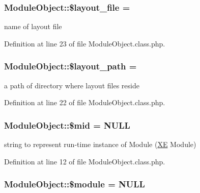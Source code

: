 \subsubsection[{\texorpdfstring{\$layout\+\_\+file}{$layout_file}}]{\setlength{\rightskip}{0pt plus 5cm}Module\+Object\+::\$layout\+\_\+file = \textquotesingle{}\textquotesingle{}}\hypertarget{classModuleObject_a2a1677b06eb7b3ff04ff19e960a64e08}{}\label{classModuleObject_a2a1677b06eb7b3ff04ff19e960a64e08}


name of layout file 



Definition at line 23 of file Module\+Object.\+class.\+php.

\subsubsection[{\texorpdfstring{\$layout\+\_\+path}{$layout_path}}]{\setlength{\rightskip}{0pt plus 5cm}Module\+Object\+::\$layout\+\_\+path = \textquotesingle{}\textquotesingle{}}\hypertarget{classModuleObject_ada660958e777413d332337fba67d657f}{}\label{classModuleObject_ada660958e777413d332337fba67d657f}


a path of directory where layout files reside 



Definition at line 22 of file Module\+Object.\+class.\+php.

\subsubsection[{\texorpdfstring{\$mid}{$mid}}]{\setlength{\rightskip}{0pt plus 5cm}Module\+Object\+::\$mid = N\+U\+LL}\hypertarget{classModuleObject_abb68807f12d0fde6c9ea78a1a820d250}{}\label{classModuleObject_abb68807f12d0fde6c9ea78a1a820d250}


string to represent run-\/time instance of Module (\hyperlink{namespaceXE}{XE} Module) 



Definition at line 12 of file Module\+Object.\+class.\+php.

\subsubsection[{\texorpdfstring{\$module}{$module}}]{\setlength{\rightskip}{0pt plus 5cm}Module\+Object\+::\$module = N\+U\+LL}\hypertarget{classModuleObject_a2809af79b38269089ba46bc922061ae8}{}\label{classModuleObject_a2809af79b38269089ba46bc922061ae8}


